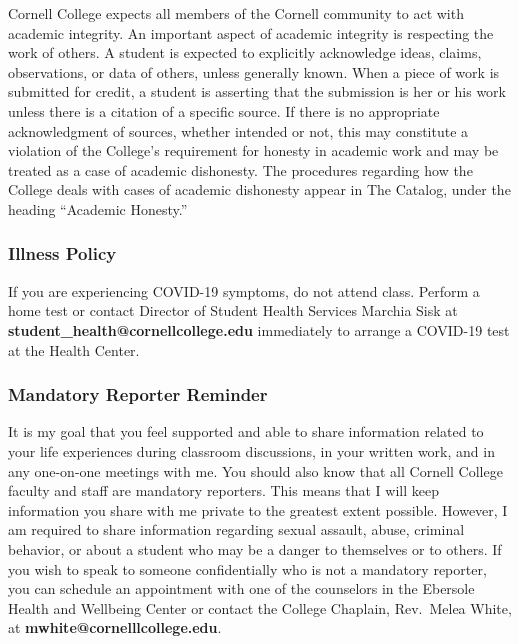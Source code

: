 \documentclass[
  letterpaper,
  DIV=11,
  numbers=noendperiod]{scrartcl}
\begin{document}
Cornell College expects all members of the Cornell community to act with
academic integrity. An important aspect of academic integrity is
respecting the work of others. A student is expected to explicitly
acknowledge ideas, claims, observations, or data of others, unless
generally known. When a piece of work is submitted for credit, a student
is asserting that the submission is her or his work unless there is a
citation of a specific source. If there is no appropriate acknowledgment
of sources, whether intended or not, this may constitute a violation of
the College's requirement for honesty in academic work and may be
treated as a case of academic dishonesty. The procedures regarding how
the College deals with cases of academic dishonesty appear in The
Catalog, under the heading ``Academic Honesty.''

\subsubsection{Illness Policy}\label{illness-policy}

If you are experiencing COVID-19 symptoms, do not attend class. Perform
a home test or contact Director of Student Health Services Marchia Sisk
at \textbf{student\_health@cornellcollege.edu} immediately to arrange a
COVID-19 test at the Health Center.

\subsubsection{Mandatory Reporter
Reminder}\label{mandatory-reporter-reminder}

It is my goal that you feel supported and able to share information
related to your life experiences during classroom discussions, in your
written work, and in any one-on-one meetings with me. You should also
know that all Cornell College faculty and staff are mandatory reporters.
This means that I will keep information you share with me private to the
greatest extent possible. However, I am required to share information
regarding sexual assault, abuse, criminal behavior, or about a student
who may be a danger to themselves or to others. If you wish to speak to
someone confidentially who is not a mandatory reporter, you can schedule
an appointment with one of the counselors in the Ebersole Health and
Wellbeing Center or contact the College Chaplain, Rev.~Melea White, at
\textbf{mwhite@cornelllcollege.edu}.
\end{document}
